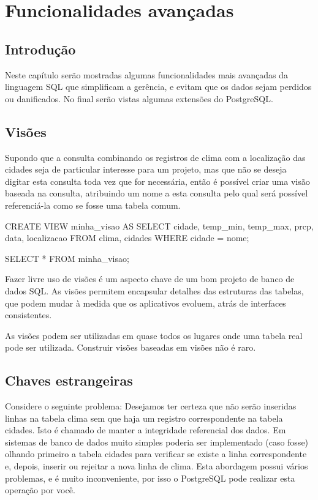 \newpage \chapter{Funcionalidades avançadas}\setcounter{SteP}{1}

\section{Introdução}\setcounter{SteP}{1}
Neste capítulo serão mostradas algumas funcionalidades mais avançadas da linguagem SQL que simplificam a gerência,
e evitam que os dados sejam perdidos ou danificados. No final serão vistas algumas extensões do PostgreSQL.



\section{Visões}\setcounter{SteP}{1}
Supondo que a consulta combinando os registros de clima com a localização das cidades seja de particular 
interesse para um projeto, mas que não se deseja digitar esta consulta toda vez que for necessária, então 
é possível criar uma visão baseada na consulta, atribuindo um nome a esta consulta pelo qual será possível 
referenciá-la como se fosse uma tabela comum.

\begin{BoxVerbatim}
CREATE VIEW minha_visao AS
    SELECT cidade, temp_min, temp_max, prcp, data, localizacao
    FROM clima, cidades
       WHERE cidade = nome;

SELECT * FROM minha_visao;
\end{BoxVerbatim}

Fazer livre uso de visões é um aspecto chave de um bom projeto de banco de dados SQL. As visões permitem 
encapsular detalhes das estruturas das tabelas, que podem mudar à medida que os aplicativos evoluem, atrás de interfaces consistentes.

As visões podem ser utilizadas em quase todos os lugares onde uma tabela real pode ser utilizada. Construir visões baseadas em visões não é raro.



\section{Chaves estrangeiras}\setcounter{SteP}{1}
Considere o seguinte problema: Desejamos ter certeza que não serão inseridas linhas na tabela clima sem que haja um registro correspondente na tabela cidades. Isto é chamado de manter a integridade referencial dos dados. Em sistemas de banco de dados muito simples poderia ser implementado (caso fosse) olhando primeiro a tabela cidades para verificar se existe a linha correspondente e, depois, inserir ou rejeitar a nova linha de clima. Esta abordagem possui vários problemas, e é muito inconveniente, por isso o PostgreSQL pode realizar esta operação por você.

